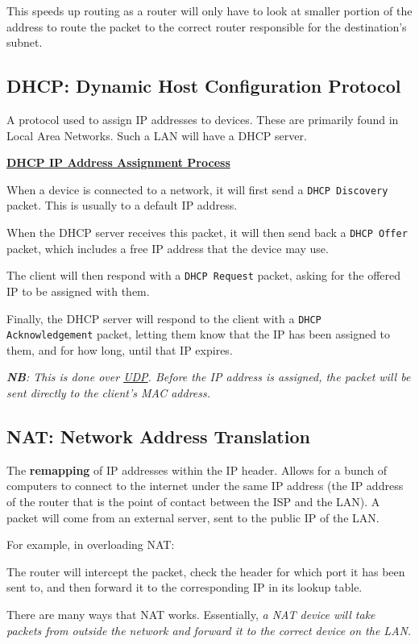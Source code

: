 \documentclass{article}
\begin{document}
This speeds up routing as a router will only have to look at smaller portion of the address to route the packet to the correct router responsible for the destination's subnet.

\subsection{DHCP: Dynamic Host Configuration Protocol}

A protocol used to assign IP addresses to devices. These are primarily found in Local Area Networks. Such a LAN will have a DHCP server.

\underline{\textbf{DHCP IP Address Assignment Process}}

When a device is connected to a network, it will first send a \texttt{DHCP Discovery} packet. This is usually to a default IP address.

When the DHCP server receives this packet, it will then send back a \texttt{DHCP Offer} packet, which includes a free IP address that the device may use.

The client will then respond with a \texttt{DHCP Request} packet, asking for the offered IP to be assigned with them.

Finally, the DHCP server will respond to the client with a \texttt{DHCP Acknowledgement} packet, letting them know that the IP has been assigned to them, and for how long, until that IP expires.

\textit{\textbf{NB}: This is done over \underline{UDP}. Before the IP address is assigned, the packet will be sent directly to the client's MAC address.}

\subsection{NAT: Network Address Translation}

The \textbf{remapping} of IP addresses within the IP header. Allows for a bunch of computers to connect to the internet under the same IP address (the IP address of the router that is the point of contact between the ISP and the LAN). A packet will come from an external server, sent to the public IP of the LAN. 

For example, in overloading NAT:

The router will intercept the packet, check the header for which port it has been sent to, and then forward it to the corresponding IP in its lookup table.

There are many ways that NAT works. Essentially, \textit{a NAT device will take packets from outside the network and forward it to the correct device on the LAN}.
\end{document}
